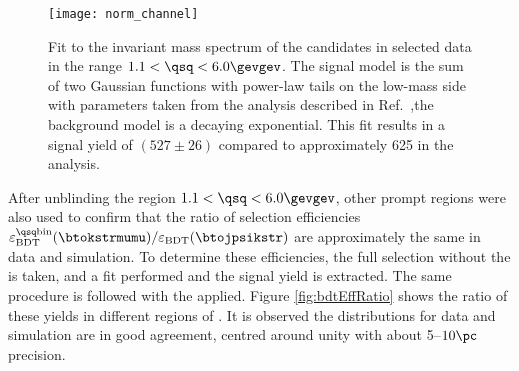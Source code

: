 \begin{figure}
  \begin{center}
    \texttt{[image: norm\_channel]}
    \caption[Fit to the normalisation channel, \btokstrmumu for $1.1<\qsq<6.0\gevgev$]
    {
      Fit to the invariant mass spectrum of the \Bd candidates in selected data in the range
      $1.1<\qsq<6.0\gevgev$.
      The signal model is the sum of two Gaussian functions with power-law tails on the low-mass
      side with parameters taken from the analysis described in
      Ref.~\protect\cite{LHCb-CONF-2015-002},the background model is a decaying exponential.
      This fit results in a signal yield of $(527\pm26)$ compared to approximately 625 in the \sm
      analysis.
    }
    \label{fig:db:norm}
  \end{center}
\end{figure}

After unblinding the region $1.1<\qsq<6.0\gevgev$, other prompt \qsq regions were also used to
confirm that the ratio of \bdt selection efficiencies
$\varepsilon_\mathrm{BDT}^\mathrm{\qsq bin}(\btokstrmumu) / \varepsilon_\mathrm{BDT}(\btojpsikstr)$
are approximately the same in data and simulation.
To determine these efficiencies, the full selection without the \BDT is taken, and a fit performed
and the signal yield is extracted.
The same procedure is followed with the \BDT applied.
Figure \ref{fig:bdtEffRatio} shows the ratio of these yields in different regions of \qsq.
It is observed the distributions for data and simulation are in good agreement,
centred around unity with about 5--$10\pc$ precision.

